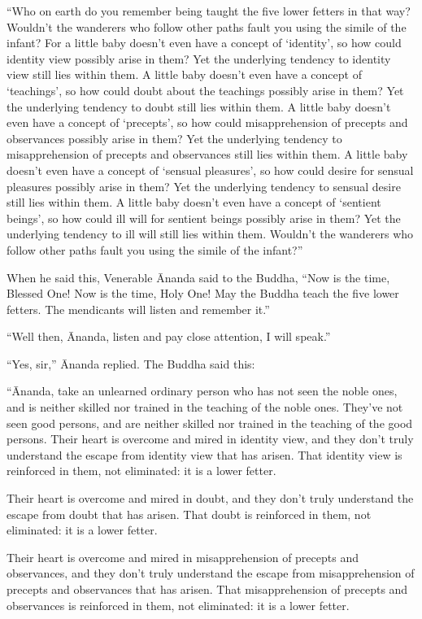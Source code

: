 \documentclass[12pt,openany]{book}%
\begin{document}
“Who on earth do you remember being taught the five lower fetters in that way? Wouldn’t the wanderers who follow other paths fault you using the simile of the infant? For a little baby doesn’t even have a concept of ‘identity’, so how could identity view possibly arise in them? Yet the underlying tendency to identity view still lies within them. A little baby doesn’t even have a concept of ‘teachings’, so how could doubt about the teachings possibly arise in them? Yet the underlying tendency to doubt still lies within them. A little baby doesn’t even have a concept of ‘precepts’, so how could misapprehension of precepts and observances possibly arise in them? Yet the underlying tendency to misapprehension of precepts and observances still lies within them. A little baby doesn’t even have a concept of ‘sensual pleasures’, so how could desire for sensual pleasures possibly arise in them? Yet the underlying tendency to sensual desire still lies within them. A little baby doesn’t even have a concept of ‘sentient beings’, so how could ill will for sentient beings possibly arise in them? Yet the underlying tendency to ill will still lies within them. Wouldn’t the wanderers who follow other paths fault you using the simile of the infant?” 

When he said this, Venerable Ānanda said to the Buddha, “Now is the time, Blessed One! Now is the time, Holy One! May the Buddha teach the five lower fetters. The mendicants will listen and remember it.” 

“Well then, Ānanda, listen and pay close attention, I will speak.” 

“Yes, sir,” Ānanda replied. The Buddha said this: 

“Ānanda, take an unlearned ordinary person who has not seen the noble ones, and is neither skilled nor trained in the teaching of the noble ones. They’ve not seen good persons, and are neither skilled nor trained in the teaching of the good persons. Their heart is overcome and mired in identity view, and they don’t truly understand the escape from identity view that has arisen. That identity view is reinforced in them, not eliminated: it is a lower fetter. 

Their heart is overcome and mired in doubt, and they don’t truly understand the escape from doubt that has arisen. That doubt is reinforced in them, not eliminated: it is a lower fetter. 

Their heart is overcome and mired in misapprehension of precepts and observances, and they don’t truly understand the escape from misapprehension of precepts and observances that has arisen. That misapprehension of precepts and observances is reinforced in them, not eliminated: it is a lower fetter. 
\end{document}

